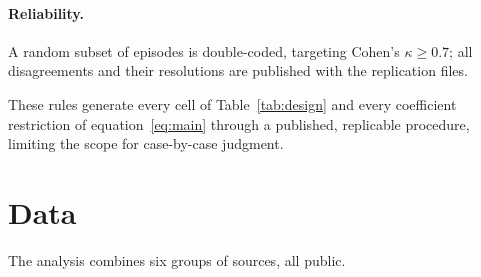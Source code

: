\documentclass[11pt]{article}
\begin{document}
\paragraph{Reliability.} A random subset of episodes is double-coded, targeting Cohen's $\kappa \geq 0.7$; all disagreements and their resolutions are published with the replication files.

These rules generate every cell of Table~\ref{tab:design} and every coefficient restriction of equation~\eqref{eq:main} through a published, replicable procedure, limiting the scope for case-by-case judgment.

\section{Data}
\label{sec:data}

The analysis combines six groups of sources, all public.
\end{document}

